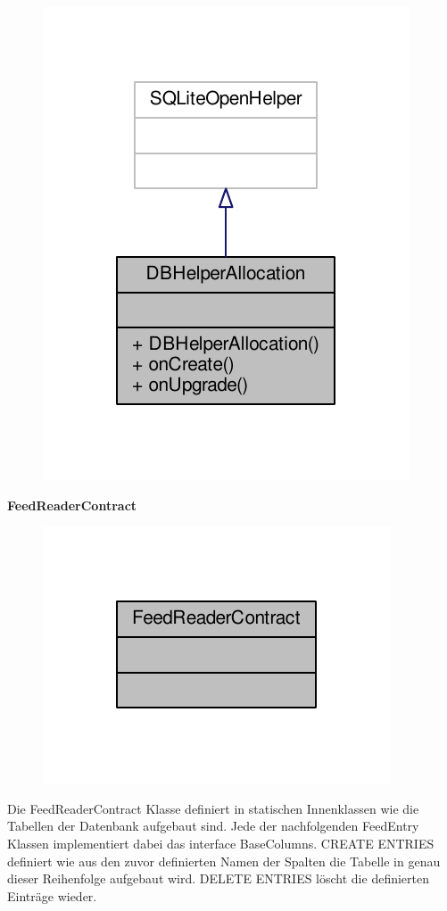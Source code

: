 \begin{figure}[H]
	\includegraphics[scale = 1]{res/umlClasses/d_b_helper_allocation__coll__graph.pdf}
	\centering
\end{figure}



\textbf{FeedReaderContract}
\begin{figure}[H]
	\includegraphics[scale = 1]{res/umlClasses/feed_reader_contract__coll__graph.pdf}
	\centering
\end{figure}
Die FeedReaderContract Klasse definiert in statischen Innenklassen wie die Tabellen der Datenbank aufgebaut sind. Jede der nachfolgenden FeedEntry Klassen implementiert dabei das interface BaseColumns.
CREATE ENTRIES definiert wie aus den zuvor definierten Namen der Spalten die Tabelle in genau dieser Reihenfolge aufgebaut wird.
DELETE ENTRIES löscht die definierten Einträge wieder.

